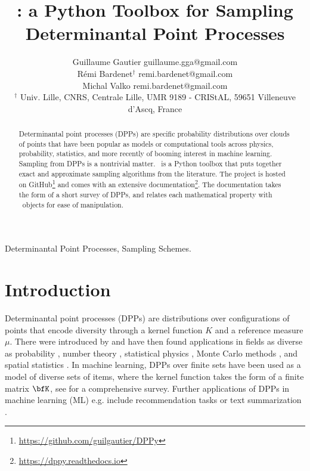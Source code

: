 \documentclass[twoside,11pt]{article}
\begin{document}
\title{\DPPy: a Python Toolbox for Sampling\\Determinantal Point Processes}

\author{\name Guillaume Gautier \email guillaume.gga@gmail.com \\
       \name R\'emi Bardenet$^\dagger$ \email remi.bardenet@gmail.com \\
       \name Michal Valko \email remi.bardenet@gmail.com \\
       \addr $^\dagger$ Univ. Lille, CNRS, Centrale Lille, UMR 9189 - CRIStAL, 59651 Villeneuve d’Ascq, France
}

\editor{}

\maketitle

\setcounter{footnote}{3}
\begin{abstract}%

  Determinantal point processes (DPPs) are specific probability distributions over clouds of points that have been popular as models or computational tools across physics, probability, statistics, and more recently of booming interest in machine learning.
  Sampling from DPPs is a nontrivial matter. \DPPy\ is a Python toolbox that puts together exact and approximate sampling algorithms from the literature.
  The project is hosted on GitHub\footnote{\url{https://github.com/guilgautier/DPPy}} and comes with an extensive documentation\footnote{\label{fn:docs}\url{https://dppy.readthedocs.io}}. The documentation takes the form of a short survey of DPPs, and relates each mathematical property with \DPPy\ objects for ease of manipulation.

\end{abstract}

\begin{keywords}
  Determinantal Point Processes, Sampling Schemes.
\end{keywords}

\section{Introduction} %
\label{sec:introduction}

  Determinantal point processes (DPPs) are distributions over configurations of points that encode diversity through a kernel function $K$ and a reference measure $\mu$.
  There were introduced by \citet{Mac75} and have then found applications in fields as diverse as probability \citep{Sos00, Kon05, HKPV06}, number theory \citep{RuSa96}, statistical physics \citep{PaBe11}, Monte Carlo methods \citep{BaHa16}, and spatial statistics \citep{LaMoRu15}.
  In machine learning, DPPs over finite sets have been used as a model of diverse sets of items, where the kernel function takes the form of a finite matrix $\bfK$, see \citep{KuTa12} for a comprehensive survey.
  Further applications of DPPs in machine learning (ML) e.g. include recommendation tasks \citep{KaDeKo16, GaPaKo16} or text summarization \citep{DuBa16}.\\
\end{document}
